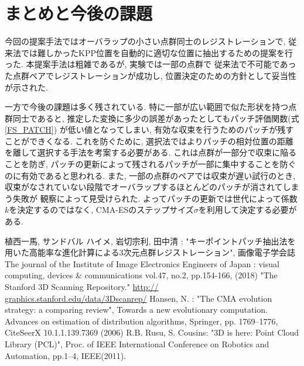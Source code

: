 \documentclass[twocolumn, 9pt, a4j, dvipdfmx]{jsarticle}
\begin{document}
\section{まとめと今後の課題}
今回の提案手法ではオーバラップの小さい点群同士のレジストレーションで, 
従来法では難しかったKPP位置を自動的に適切な位置に抽出するための提案を行った.
本提案手法は粗雑であるが, 実験では一部の点群で
従来法で不可能であった点群ペアでレジストレーションが成功し, 
位置決定のための方針として妥当性が示された. 

一方で今後の課題は多く残されている. 
特に一部が広い範囲で似た形状を持つ点群同士であると, 
推定した変換に多少の誤差があったとしてもパッチ評価関数(式\ref{FS_PATCH})
が低い値となってしまい, 
有効な収束を行うためのパッチが残すことができくなる. 
これを防ぐために, 
選択法ではよりパッチの相対位置の距離を離して選択する手法を考案する必要がある. 
これは点群が一部分で収束に陥ることを防ぎ, 
パッチの更新によって残されるパッチが一部に集中することを防ぐのに有効であると思われる. 
また, 一部の点群のペアでは収束が遅い試行のとき, 
収束がなされていない段階でオーバラップするほとんどのパッチが消されてしまう失敗が
観察によって見受けられた. 
よってパッチの更新では世代によって係数$k$を決定するのではなく, 
CMA-ESのステップサイズ$\sigma$を利用して決定する必要がある. 
\small
\vspace{-0.5em}
\begin{thebibliography}{4}
 植西一馬, サンドバル ハイメ, 岩切宗利, 田中清 : 
"キーポイントパッチ抽出法を用いた高能率な進化計算による3次元点群レジストレーション", 
画像電子学会誌 The journal of the Institute of Image Electronics Engineers of Japan : 
visual computing, devices \& communications vol.47, no.2, pp.154-166, (2018)
 "The Stanford 3D Scanning Repository." \url{http://
graphics.stanford.edu/data/3Dscanrep/} 
 Hansen, N. : 
"The CMA evolution strategy: a comparing review", Towards a new evolutionary 
computation. Advances on estimation of distribution algorithms, 
Springer, pp. 1769–1776, CiteSeerX 10.1.1.139.7369 (2006)
R.B. Rusu, S. Cousins: "3D is here: Point Cloud Library (PCL)", 
Proc. of IEEE International Conference on Robotics and Automation, pp.1–4, 
IEEE(2011).
\end{thebibliography}
\normalsize
\end{document}
